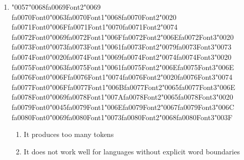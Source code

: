 \documentclass[12pt]{article}
\begin{document}
\begin{enumerate}[label=Q\arabic*.]
\begin{enumerate}[label=(\Alph*)]
    \item To label each token with a grammatical category
    \item To convert text into a sequence of symbols suitable for modeling
    \item To reduce vocabulary size to zero
    \item To assign probabilities to sentences
\end{enumerate}
\item {\char"0057}{\char"0068}{\csname fa0069Font2\endcsname\char"0069} {\csname fa0070Font0\endcsname\char"0063}{\csname fa0070Font1\endcsname\char"0068}{\csname fa0070Font2\endcsname\char"0020} {\csname fa0071Font0\endcsname\char"006F}{\csname fa0071Font1\endcsname\char"0070}{\csname fa0071Font2\endcsname\char"0074} {\csname fa0072Font0\endcsname\char"0069}{\csname fa0072Font1\endcsname\char"006F}{\csname fa0072Font2\endcsname\char"006E}{\csname fa0072Font3\endcsname\char"0020} {\csname fa0073Font0\endcsname\char"0073}{\csname fa0073Font1\endcsname\char"0061}{\csname fa0073Font2\endcsname\char"0079}{\csname fa0073Font3\endcsname\char"0073} {\csname fa0074Font0\endcsname\char"0020}{\csname fa0074Font1\endcsname\char"0069}{\csname fa0074Font2\endcsname\char"0074}{\csname fa0074Font3\endcsname\char"0020} {\csname fa0075Font0\endcsname\char"0063}{\csname fa0075Font1\endcsname\char"0061}{\csname fa0075Font2\endcsname\char"006E}{\csname fa0075Font3\endcsname\char"006E} {\csname fa0076Font0\endcsname\char"006F}{\csname fa0076Font1\endcsname\char"0074}{\csname fa0076Font2\endcsname\char"0020}{\csname fa0076Font3\endcsname\char"0074} {\csname fa0077Font0\endcsname\char"006F}{\csname fa0077Font1\endcsname\char"006B}{\csname fa0077Font2\endcsname\char"0065}{\csname fa0077Font3\endcsname\char"006E} {\csname fa0078Font0\endcsname\char"0069}{\csname fa0078Font1\endcsname\char"007A}{\csname fa0078Font2\endcsname\char"0065}{\csname fa0078Font3\endcsname\char"0020} {\csname fa0079Font0\endcsname\char"0045}{\csname fa0079Font1\endcsname\char"006E}{\csname fa0079Font2\endcsname\char"0067}{\csname fa0079Font3\endcsname\char"006C} {\csname fa0080Font0\endcsname\char"0069}{\csname fa0080Font1\endcsname\char"0073}{\csname fa0080Font2\endcsname\char"0068}{\csname fa0080Font3\endcsname\char"003F}
\begin{enumerate}[label=(\Alph*)]
    \item It produces too many tokens
    \item It does not work well for languages without explicit word boundaries

\end{enumerate}
\end{enumerate}
\end{document}
